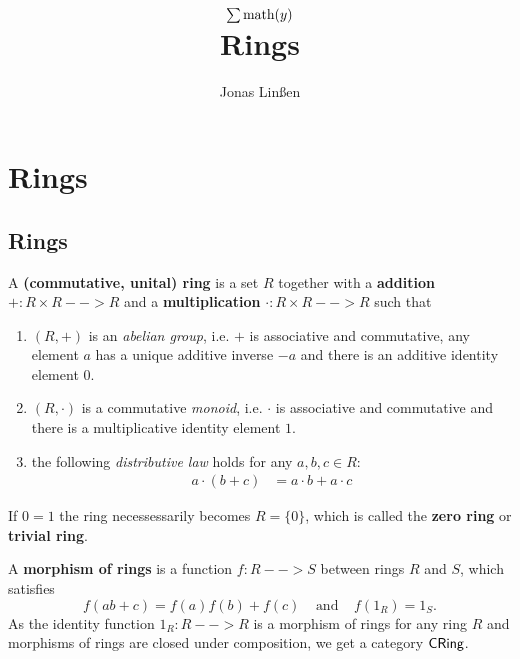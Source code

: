 

\title{
	$\sum \text{math}(y)$\\
	Rings
}
\author{Jonas Linßen}


	\maketitle
	\tableofcontents

	\newpage
	\section{Rings}
	\subsection{Rings}
	\begin{definition}
		A \textbf{(commutative, unital) ring} is a set $R$ together with a \textbf{addition} $+: R \times R --> R$ and a \textbf{multiplication} $\cdot: R \times R --> R$ such that 
		\begin{enumerate}
			\item{
				$(R,+)$ is an \textit{abelian group}, i.e. $+$ is associative and commutative, any element $a$ has a unique additive inverse $-a$ and there is an additive identity element $0$. 
			}
			\item{
				$(R,\cdot)$ is a commutative \textit{monoid}, i.e. $\cdot$ is associative and commutative and there is a multiplicative identity element $1$.
			}
			\item{
				the following \textit{distributive law} holds for any $a,b,c \in R$:
				\begin{align*}
					a \cdot (b+c) &= a \cdot b + a \cdot c
				\end{align*}
			}
		\end{enumerate}

		If $0 = 1$ the ring necessessarily becomes $R = \{0\}$, which is called the \textbf{zero ring} or \textbf{trivial ring}.
	\end{definition}


	\begin{definition}
		A \textbf{morphism of rings} is a function $f:R --> S$ between rings $R$ and $S$, which satisfies
		\begin{equation*}
			f(ab + c) = f(a)f(b) + f(c) \;\;\;\;\text{and}\;\;\;\; f(1_R) = 1_S.
		\end{equation*}
		As the identity function $1_R: R --> R$ is a morphism of rings for any ring $R$ and morphisms of rings are closed under composition, we get a category $\textsf{CRing}$.
	\end{definition}

